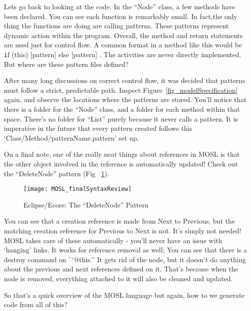 Lets go back to looking at the code. In the ``Node'' class, a few methods have been declared. You can see each function is remarkably small. In fact,the only thing the functions are doing are calling patterns. These patterns represent dynamic action within the program. Overall, the method and return statements are used just for control flow. A common format in a method like this would be {\texttt if (this) [pattern] else [pattern] }. The activities are never directly implemented. But where are these pattern files defined?

After many long discussions on correct control flow, it was decided that patterns must follow a strict, predictable path. Inspect Figure~\ref{fig_modelSpecification} again, and observe the locations where the patterns are stored. You'll notice that there is a folder for the ``Node'' class, and a folder for each method within that space. There's no folder for ``List'' purely because it never calls a pattern. It is imperative in the future that every pattern created follows this `Class/Method/patternName.pattern' set up. %

On a final note, one of the really neat things about references in MOSL is that the other object involved in the reference is automatically updated! Check out the ``DeleteNode'' pattern (Fig ~\ref{fig_MOSLOverview}). 

 \begin{figure}[htbp]
  \centering
  \texttt{[image: MOSL\_finalSyntaxReview]}
  \caption{Eclipse/Ecore: The ``DeleteNode'' Pattern}
  \label{fig_MOSLOverview}
\end{figure}

\pagebreak
{}

You can see that a creation reference is made from Next to Previous, but the matching creation reference for Previous to Next is not. It's simply not needed! MOSL takes care of these automatically - you'll never have an issue with `hanging' links. It works for reference removal as well; You can see that there is a destroy command on {\texttt ``@this.''} It gets rid of the node, but it doesn't do anything about the previous and next references defined on it. That's because when the node is removed, everything attached to it will also be cleaned and updated.
 
So that's a quick overview of the MOSL language but again, how to we generate code from all of this?

